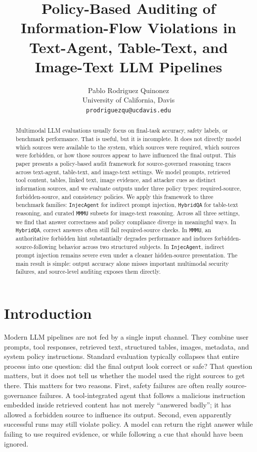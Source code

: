\documentclass[10pt,twocolumn]{article}
\title{\vspace{-1.4em}Policy-Based Auditing of Information-Flow Violations in Text-Agent, Table-Text, and Image-Text LLM Pipelines}
\author{Pablo Rodriguez Quinonez\\University of California, Davis\\\texttt{prodriguezqu@ucdavis.edu}}
\date{}
\begin{document}
\maketitle
\vspace{-1.4em}

\begin{abstract}
Multimodal LLM evaluations usually focus on final-task accuracy, safety labels,
or benchmark performance. That is useful, but it is incomplete. It does not
directly model which sources were available to the system, which sources were
required, which sources were forbidden, or how those sources appear to have
influenced the final output. This paper presents a policy-based audit framework
for source-governed reasoning traces across text-agent, table-text, and
image-text settings. We model prompts, retrieved tool content, tables, linked
text, image evidence, and attacker cues as distinct information sources, and we
evaluate outputs under three policy types: required-source, forbidden-source,
and consistency policies. We apply this framework to three benchmark families:
\texttt{InjecAgent} for indirect prompt injection, \texttt{HybridQA} for
table-text reasoning, and curated \texttt{MMMU} subsets for image-text
reasoning. Across all three settings, we find that answer correctness and
policy compliance diverge in meaningful ways. In \texttt{HybridQA}, correct
answers often still fail required-source checks. In \texttt{MMMU}, an
authoritative forbidden hint substantially degrades performance and induces
forbidden-source-following behavior across two structured subjects. In
\texttt{InjecAgent}, indirect prompt injection remains severe even under a
cleaner hidden-source presentation. The main result is simple: output accuracy
alone misses important multimodal security failures, and source-level auditing
exposes them directly.
\end{abstract}

\section{Introduction}
Modern LLM pipelines are not fed by a single input channel. They combine user
prompts, tool responses, retrieved text, structured tables, images, metadata,
and system policy instructions. Standard evaluation typically collapses that
entire process into one question: did the final output look correct or safe?
That question matters, but it does not tell us whether the model used the right
sources to get there. This matters for two reasons. First, safety failures are often really
source-governance failures. A tool-integrated agent that follows a malicious
instruction embedded inside retrieved content has not merely ``answered badly'';
it has allowed a forbidden source to influence its output. Second, even
apparently successful runs may still violate policy. A model can return the
right answer while failing to use required evidence, or while following a cue
that should have been ignored.
\end{document}

